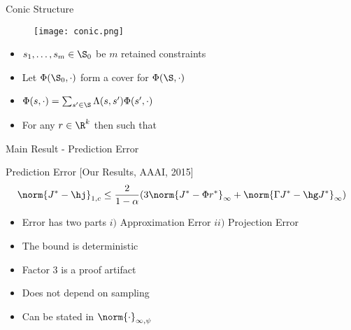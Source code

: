 \documentclass[handout,10pt]{beamer}
\begin{document}
\begin{frame}[fragile]{Conic Structure}
\begin{figure}
\texttt{[image: conic.png]}
\end{figure}
\begin{block}{}
\begin{itemize}
\item $s_1,\ldots,s_m\in \S_0$ be $m$ retained constraints
\item Let $\Phi(\S_0,\cdot)$ form a {\color{orange}{conic}} cover for $\Phi(\S,\cdot)$
\item $\Phi(s,\cdot)=\sum_{s'\in \S}\Lambda(s,s')\Phi(s',\cdot)$
\item For any $r\in \R^k$ {\color{orange}{$\Phi(s,\cdot) r<0$}} then {\color{orange}{$\exists s'\in \S_0$}} such that {\color{orange}{$\Phi(s',\cdot) r<0$}}
\end{itemize}
\end{block}

\end{frame}



\begin{frame}[fragile]{Main Result - Prediction Error}

\begin{block}{Prediction Error [Our Results, AAAI, 2015]}
\begin{align*}
\norm{J^*-\hj}_{1,c}\leq \frac{2}{1-\alpha}( 3\norm{J^*-\Phi r^*}_{\infty}+ \norm{\Gamma J^*-\hg J^*}_{\infty})
\end{align*}
\end{block}


\begin{itemize}
\item Error has two parts $i)$ Approximation Error $ii)$ Projection Error
\item The bound is deterministic
\item Factor $3$ is a proof artifact
\item Does not depend on sampling
\item Can be stated in $\norm{\cdot}_{\infty,\psi}$
\end{itemize}
\end{frame}
\end{document}
